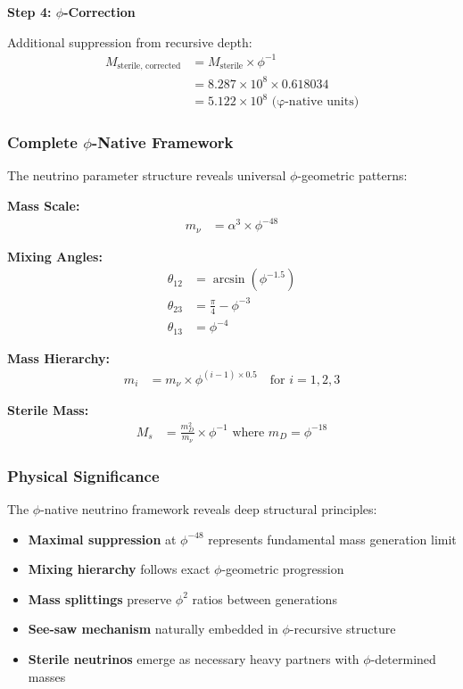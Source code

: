 \textbf{Step 4: $\phi$-Correction}

Additional suppression from recursive depth:
\begin{align}
M_{\text{sterile, corrected}} &= M_{\text{sterile}} \times \phi^{-1} \\
&= 8.287 \times 10^{8} \times 0.618034 \\
&= 5.122 \times 10^{8} \text{ (φ-native units)}
\end{align}

\subsubsection{Complete $\phi$-Native Framework}

The neutrino parameter structure reveals universal $\phi$-geometric patterns:

\textbf{Mass Scale:}
\begin{align}
m_\nu &= \alpha^3 \times \phi^{-48}
\end{align}

\textbf{Mixing Angles:}
\begin{align}
\theta_{12} &= \arcsin(\phi^{-1.5}) \\
\theta_{23} &= \frac{\pi}{4} - \phi^{-3} \\
\theta_{13} &= \phi^{-4}
\end{align}

\textbf{Mass Hierarchy:}
\begin{align}
m_i &= m_\nu \times \phi^{(i-1) \times 0.5} \quad \text{for } i = 1,2,3
\end{align}

\textbf{Sterile Mass:}
\begin{align}
M_s &= \frac{m_D^2}{m_\nu} \times \phi^{-1} \text{ where } m_D = \phi^{-18}
\end{align}

\subsubsection{Physical Significance}

The $\phi$-native neutrino framework reveals deep structural principles:

\begin{itemize}
\item \textbf{Maximal suppression} at $\phi^{-48}$ represents fundamental mass generation limit
\item \textbf{Mixing hierarchy} follows exact $\phi$-geometric progression
\item \textbf{Mass splittings} preserve $\phi^2$ ratios between generations
\item \textbf{See-saw mechanism} naturally embedded in $\phi$-recursive structure
\item \textbf{Sterile neutrinos} emerge as necessary heavy partners with $\phi$-determined masses
\end{itemize}

